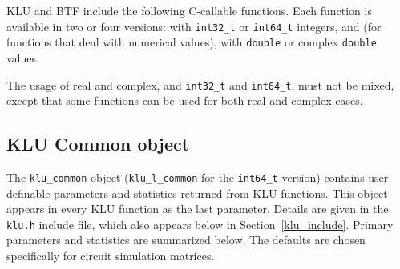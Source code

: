 \documentclass[11pt]{article}
\begin{document}
KLU and BTF include the following C-callable functions.  Each function is
available in two or four versions: with \verb'int32_t' or \verb'int64_t' integers, and
(for functions that deal with numerical values), with {\tt double} or complex
{\tt double} values.

The usage of real and complex, and \verb'int32_t' and \verb'int64_t', must not be
mixed, except that some functions can be used for both real and complex cases.

\subsection{KLU Common object}

The {\tt klu\_common} object ({\tt klu\_l\_common} for the \verb'int64_t'
version) contains user-definable parameters and statistics returned from
KLU functions.  This object appears in every KLU function as the last
parameter.  Details are given in the {\tt klu.h} include file, which also
appears below in Section~\ref{klu_include}.  Primary parameters and statistics
are summarized below.  The defaults are chosen specifically for circuit
simulation matrices.
\end{document}
